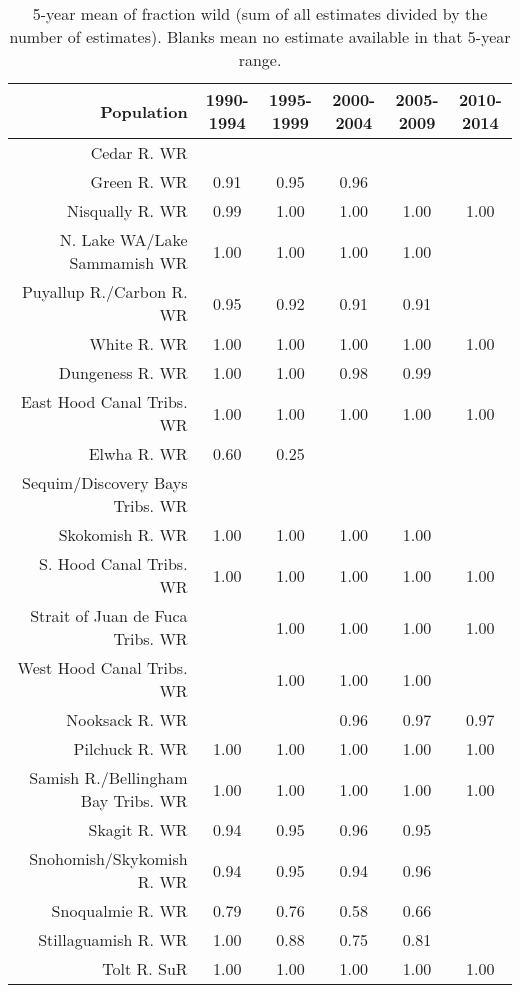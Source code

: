 \documentclass[]{article}
\begin{document}
\begin{table}[p]
\centering
\caption{5-year mean of fraction wild (sum of all estimates divided by the number of estimates).  Blanks mean no estimate available in that 5-year range.} 
\begin{tabular}{r|ccccc}
  \hline
Population & 1990-1994 & 1995-1999 & 2000-2004 & 2005-2009 & 2010-2014 \\ 
  \hline
Cedar R. WR &  &  &  &  &  \\ 
  Green R. WR & 0.91 & 0.95 & 0.96 &  &  \\ 
  Nisqually R. WR & 0.99 & 1.00 & 1.00 & 1.00 & 1.00 \\ 
  N. Lake WA/Lake Sammamish WR & 1.00 & 1.00 & 1.00 & 1.00 &  \\ 
  Puyallup R./Carbon R. WR & 0.95 & 0.92 & 0.91 & 0.91 &  \\ 
  White R. WR & 1.00 & 1.00 & 1.00 & 1.00 & 1.00 \\ 
  Dungeness R. WR & 1.00 & 1.00 & 0.98 & 0.99 &  \\ 
  East Hood Canal Tribs. WR & 1.00 & 1.00 & 1.00 & 1.00 & 1.00 \\ 
  Elwha R. WR & 0.60 & 0.25 &  &  &  \\ 
  Sequim/Discovery Bays Tribs. WR &  &  &  &  &  \\ 
  Skokomish R. WR & 1.00 & 1.00 & 1.00 & 1.00 &  \\ 
  S. Hood Canal Tribs. WR & 1.00 & 1.00 & 1.00 & 1.00 & 1.00 \\ 
  Strait of Juan de Fuca Tribs. WR &  & 1.00 & 1.00 & 1.00 & 1.00 \\ 
  West Hood Canal Tribs. WR &  & 1.00 & 1.00 & 1.00 &  \\ 
  Nooksack R. WR &  &  & 0.96 & 0.97 & 0.97 \\ 
  Pilchuck R. WR & 1.00 & 1.00 & 1.00 & 1.00 & 1.00 \\ 
  Samish R./Bellingham Bay Tribs. WR & 1.00 & 1.00 & 1.00 & 1.00 & 1.00 \\ 
  Skagit R. WR & 0.94 & 0.95 & 0.96 & 0.95 &  \\ 
  Snohomish/Skykomish R. WR & 0.94 & 0.95 & 0.94 & 0.96 &  \\ 
  Snoqualmie R. WR & 0.79 & 0.76 & 0.58 & 0.66 &  \\ 
  Stillaguamish R. WR & 1.00 & 0.88 & 0.75 & 0.81 &  \\ 
  Tolt R. SuR & 1.00 & 1.00 & 1.00 & 1.00 & 1.00 \\ 
   \hline
\end{tabular}
\end{table}
\end{document}
